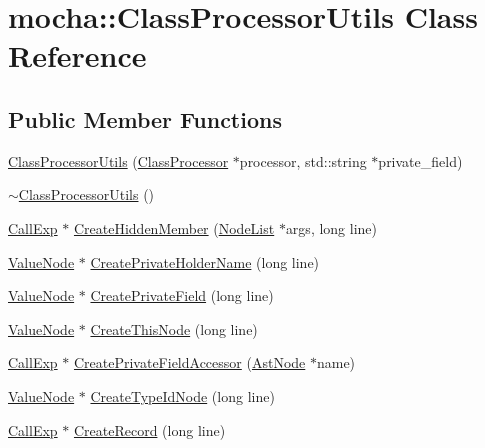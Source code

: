 \hypertarget{classmocha_1_1_class_processor_utils}{
\section{mocha::ClassProcessorUtils Class Reference}
\label{classmocha_1_1_class_processor_utils}
}
\subsection*{Public Member Functions}
\begin{DoxyCompactItemize}
\item 
\hyperlink{classmocha_1_1_class_processor_utils_ab68b22b8df753884d141c79423128759}{ClassProcessorUtils} (\hyperlink{classmocha_1_1_class_processor}{ClassProcessor} $\ast$processor, std::string $\ast$private\_\-field)
\item 
\hyperlink{classmocha_1_1_class_processor_utils_a27c762615ca89f0543d08d286f6d8981}{$\sim$ClassProcessorUtils} ()
\item 
\hyperlink{classmocha_1_1_call_exp}{CallExp} $\ast$ \hyperlink{classmocha_1_1_class_processor_utils_a610865dafa045c1406bebd542b5c5d83}{CreateHiddenMember} (\hyperlink{classmocha_1_1_node_list}{NodeList} $\ast$args, long line)
\item 
\hyperlink{classmocha_1_1_value_node}{ValueNode} $\ast$ \hyperlink{classmocha_1_1_class_processor_utils_af75b7f05a1ec3c13d31b98b977bf82ec}{CreatePrivateHolderName} (long line)
\item 
\hyperlink{classmocha_1_1_value_node}{ValueNode} $\ast$ \hyperlink{classmocha_1_1_class_processor_utils_a330e44d58fbec85a47df4a7721679471}{CreatePrivateField} (long line)
\item 
\hyperlink{classmocha_1_1_value_node}{ValueNode} $\ast$ \hyperlink{classmocha_1_1_class_processor_utils_ab57d62ddfbaeb403018b214da4d09067}{CreateThisNode} (long line)
\item 
\hyperlink{classmocha_1_1_call_exp}{CallExp} $\ast$ \hyperlink{classmocha_1_1_class_processor_utils_aa60e32378408cad91c137cac3f69bcbc}{CreatePrivateFieldAccessor} (\hyperlink{classmocha_1_1_ast_node}{AstNode} $\ast$name)
\item 
\hyperlink{classmocha_1_1_value_node}{ValueNode} $\ast$ \hyperlink{classmocha_1_1_class_processor_utils_a14bb29392495622b718afc8542e77d7f}{CreateTypeIdNode} (long line)
\item 
\hyperlink{classmocha_1_1_call_exp}{CallExp} $\ast$ \hyperlink{classmocha_1_1_class_processor_utils_ac7e7158b65ce6bc045868d46763c3634}{CreateRecord} (long line)

\end{DoxyCompactItemize}
